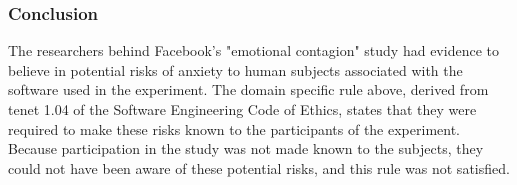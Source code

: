 \subsubsection{Conclusion}
The researchers behind Facebook's "emotional contagion" study had evidence to believe in potential risks of anxiety to human subjects associated with the software used in the experiment.  The domain specific rule above, derived from tenet 1.04 of the Software Engineering Code of Ethics, states that they were required to make these risks known to the participants of the experiment.  Because participation in the study was not made known to the subjects, they could not have been aware of these potential risks, and this rule was not satisfied.
\vspace{0.2cm}
